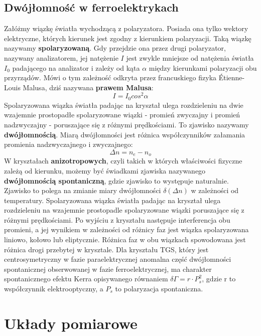 \documentclass{article}
\begin{document}
\subsection{Dwójłomność w ferroelektrykach}
Załóżmy wiązkę światła wychodzącą z polaryzatora. Posiada ona tylko wektory elektryczne, których kierunek jest zgodny z kierunkiem polaryzacji. Taką wiązkę nazywamy \textbf{spolaryzowaną}. Gdy przejdzie ona przez drugi polaryzator, nazywany analizatorem, jej natężenie $I$ jest zwykle mniejsze od natężenia światła $I_{0}$  padającego na analizator i zależy od kąta $\alpha$ między kierunkami polaryzacji obu przyrządów. Mówi o tym zależność odkryta przez francuskiego fizyka Étienne-Louis Malusa, dziś nazywana \textbf{prawem Malusa}: \cite{malus}
\begin{equation}
I=I_{0}cos^{2}\alpha
\end{equation}
Spolaryzowana wiązka światła padając na kryształ ulega rozdzieleniu na dwie wzajemnie prostopadłe spolaryzowane wiązki - promień zwyczajny i promień nadzwyczajny - poruszające się z różnymi prędkościami. To zjawisko nazywamy \textbf{dwójłomnością}. Miarą dwójłomności jest różnica współczynników załamania promienia nadzwyczajnego i zwyczajnego\cite{dwoj}:
\begin{equation}
\Delta n = n_{e} - n_{o}
\end{equation}
W kryształach \textbf{anizotropowych}, czyli takich w których właściwości fizyczne zależą od kierunku, możemy być świadkami zjawiska nazywanego \textbf{dwójłomnością spontaniczną}, gdzie zjawisko to występuje naturalnie. Zjawisko to polega na zmianie miary dwójłomności $\delta(\Delta n)$ w zależności od temperatury. Spolaryzowana wiązka światła padając na kryształ ulega rozdzieleniu na wzajemnie prostopadle spolaryzowane wiązki poruszające się z różnymi prędkościami. Po wyjściu z kryształu następuje interferencja obu promieni, a jej wynikiem w zależności od różnicy faz jest wiązka spolaryzowana liniowo, kołowo lub eliptycznie. Różnica faz w obu wiązkach spowodowana jest różnica drogi przebytej w krysztale. Dla kryształu TGS, który jest centrosymetryczny w fazie paraelektrycznej anomalna część dwójłomności spontanicznej obserwowanej w fazie ferroelektrycznej, ma charakter spontanicznego efektu Kerra opisywanego równaniem $\delta \Gamma = r\cdot P_{s}^{2}$, gdzie r to współczynnik elektrooptyczny, a $P_{s}$ to polaryzacja spontaniczna.

\section{Układy pomiarowe}
\end{document}
